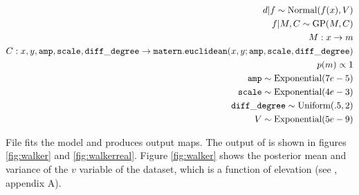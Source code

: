 \begin{eqnarray*}
    d|f \sim \textup{Normal}(f(x),V)\\
    f|M,C \sim \textup{GP}(M,C) \\
    M:x\rightarrow m\\
    C:x,y,\mathtt{amp},\mathtt{scale},\mathtt{diff\_degree}\rightarrow \mathtt{matern.euclidean}(x,y;\mathtt{amp},\mathtt{scale},\mathtt{diff\_degree})\\
    p(m)\propto 1\\
    \mathtt{amp}\sim \textup{Exponential}(7e-5) \\
    \mathtt{scale}\sim \textup{Exponential}(4e-3) \\
    \mathtt{diff\_degree}\sim \textup{Uniform}(.5,2)\\
    V\sim \textup{Exponential}(5e-9)\\
\end{eqnarray*}

File  fits the model and produces output maps.  The output of  is shown in figures \ref{fig:walker} and \ref{fig:walkerreal}. Figure \ref{fig:walker} shows the posterior mean and variance of the $v$ variable of the dataset, which is a function of elevation (see \cite{isaaks}, appendix A).